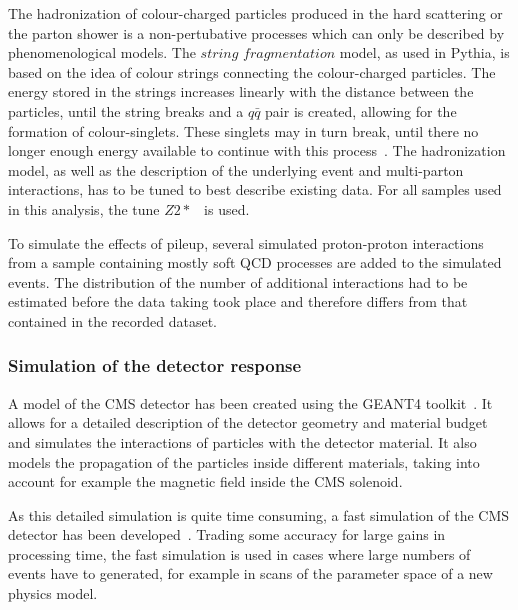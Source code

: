 The hadronization of colour-charged particles produced in the hard scattering or the parton shower is a non-pertubative processes which can only be described by phenomenological models. The $\textit{string fragmentation}$ model, as used in Pythia, is based on the idea of colour strings connecting the colour-charged particles. The energy stored in the strings increases linearly with the distance between the  particles, until the string breaks and a $q\bar{q}$ pair is created, allowing for the formation of colour-singlets. These singlets may in turn break, until there no longer enough energy available to continue with this process~\cite{Pythia}. The hadronization model, as well as the description of the underlying event and multi-parton interactions, has to be tuned to best describe existing data. For all samples used in this analysis, the tune $Z2{*}$~\cite{Field:2011iq} is used. 

To simulate the effects of pileup, several simulated proton-proton interactions from a sample containing mostly soft QCD processes are added to the simulated events. The distribution of the number of additional interactions had to be estimated before the data taking took place and therefore differs from that contained in the recorded dataset. 

\subsubsection{Simulation of the detector response}
A model of the CMS detector has been created using the GEANT4 toolkit~\cite{Agostinelli:2002hh}. It allows for a detailed description of the detector geometry and material budget and simulates the interactions of particles with the detector material. It also models the propagation of the particles inside different materials, taking into account for example the magnetic field inside the CMS solenoid. 

As this detailed simulation is quite time consuming, a fast simulation of the CMS detector has been developed~\cite{1742-6596-331-3-032049}. Trading some accuracy for large gains in processing time, the fast simulation is used in cases where large numbers of events have to generated, for example in scans of the parameter space of a new physics model.   

